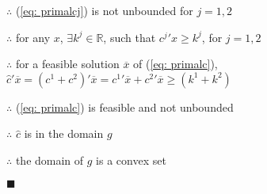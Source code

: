 $\therefore$ (\ref{eq: primalcj}) is not unbounded for $j=1,2$

$\therefore$ for any $x$, $\exists k^j\in{}\mathbb{R}$, such that ${c^j}'x\geq{}k^j$, for $j=1,2$

$\therefore$ for a feasible solution $\overline{x}$ of (\ref{eq: primalc}), $\widehat{c}'\overline{x}=({c^1}+{c^2})'\overline{x}={c^1}'\overline{x}
+{c^2}'\overline{x}\geq{}(k^1+k^2)$

$\therefore$ (\ref{eq: primalc}) is feasible and not unbounded

$\therefore$ $\widehat{c}$ is in the domain $g$

$\therefore$ the domain of $g$ is a convex set
\begin{flushright} $\blacksquare$ \end{flushright}
